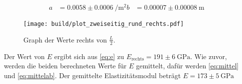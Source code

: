 \begin{align}
    a &= 0.0058 \pm \SI{0.0006}{\per \meter\squared}
    b &= 0.00007 \pm \SI{0.00008}{\meter}
\end{align}

\begin{figure}
    \centering
    \texttt{[image: build/plot\_zweiseitig\_rund\_rechts.pdf]}
    \caption{Graph der Werte rechts von $\frac{L}{2}$.}
    \label{fig:zweiseitg_rund_plot_rechts}
\end{figure}

Der Wert von $E$ ergibt sich aus \autoref{eq:e} zu $E_\text{rechts} = 191 \pm \SI{6}{\giga\pascal}$.
Wie zuvor, werden die beiden berechneten Werte für $E$ gemittelt, dafür werden \autoref{eq:mittel} und \autoref{eq:mittelab}. 
Der gemittelte Elastizitätsmodul beträgt $E = 173 \pm \SI{5}{\giga\pascal}$